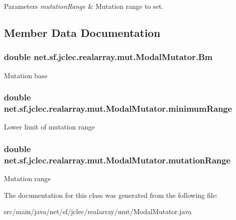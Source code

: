 \begin{DoxyParams}{Parameters}
{\em mutation\-Range} & Mutation range to set. \\
\hline
\end{DoxyParams}


\subsection{Member Data Documentation}
\hypertarget{classnet_1_1sf_1_1jclec_1_1realarray_1_1mut_1_1_modal_mutator_a5c45cb963875e79adfac82a81c184960}{
\subsubsection[{Bm}]{\setlength{\rightskip}{0pt plus 5cm}double net.\-sf.\-jclec.\-realarray.\-mut.\-Modal\-Mutator.\-Bm\hspace{0.3cm}{\ttfamily [protected]}}}\label{classnet_1_1sf_1_1jclec_1_1realarray_1_1mut_1_1_modal_mutator_a5c45cb963875e79adfac82a81c184960}
Mutation base \hypertarget{classnet_1_1sf_1_1jclec_1_1realarray_1_1mut_1_1_modal_mutator_aaebd51ca8680281d4562f8164323b8ac}{
\subsubsection[{minimum\-Range}]{\setlength{\rightskip}{0pt plus 5cm}double net.\-sf.\-jclec.\-realarray.\-mut.\-Modal\-Mutator.\-minimum\-Range\hspace{0.3cm}{\ttfamily [protected]}}}\label{classnet_1_1sf_1_1jclec_1_1realarray_1_1mut_1_1_modal_mutator_aaebd51ca8680281d4562f8164323b8ac}
Lower limit of mutation range \hypertarget{classnet_1_1sf_1_1jclec_1_1realarray_1_1mut_1_1_modal_mutator_a17b95fc4286f6efc3a3eeac3e7d7e989}{
\subsubsection[{mutation\-Range}]{\setlength{\rightskip}{0pt plus 5cm}double net.\-sf.\-jclec.\-realarray.\-mut.\-Modal\-Mutator.\-mutation\-Range\hspace{0.3cm}{\ttfamily [protected]}}}\label{classnet_1_1sf_1_1jclec_1_1realarray_1_1mut_1_1_modal_mutator_a17b95fc4286f6efc3a3eeac3e7d7e989}
Mutation range 

The documentation for this class was generated from the following file\-:\begin{DoxyCompactItemize}
\item 
src/main/java/net/sf/jclec/realarray/mut/Modal\-Mutator.\-java\end{DoxyCompactItemize}
